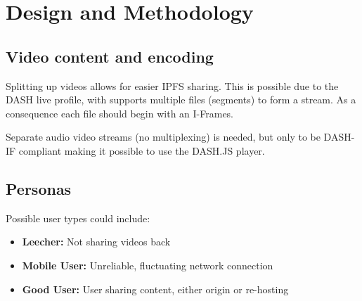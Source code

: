 \chapter{Design and Methodology}
\label{cha:design-and-method}
\section{Video content and encoding}
Splitting up videos allows for easier \acs{IPFS} sharing. This is possible due to the DASH live profile, with supports multiple files (segments) to form a stream. As a consequence each file should begin with an I-Frames.

Separate audio video streams (no multiplexing) is needed, but only to be DASH-IF compliant making it possible to use the DASH.JS player.

\section{Personas}
Possible user types could include:
\begin{itemize}
    \item \textbf{Leecher:}
    Not sharing videos back
    \item \textbf{Mobile User:}
    Unreliable, fluctuating network connection
    \item \textbf{Good User:}
    User sharing content, either origin or re-hosting
\end{itemize}

